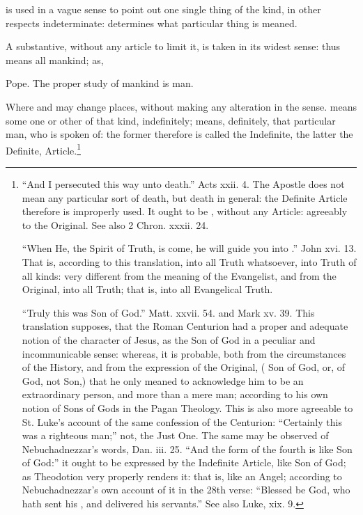  is used in a vague sense to point out one single thing of the
kind, in other respects indeterminate:  determines what
particular thing is meaned.

A substantive, without any article to limit it, is taken in its widest
sense: thus  means all mankind; as,

\begin{aquote}{Pope.}
  The proper study of mankind is man.
\end{aquote}

Where  and  may change places, without making any
alteration in the sense.  means some one or other of that
kind, indefinitely;  means, definitely, that particular man,
who is spoken of: the former therefore is called the Indefinite, the
latter the Definite, Article.\footnote{``And I persecuted this way unto
   death.'' Acts xxii. 4. The Apostle does not mean any
  particular sort of death, but death in general: the Definite Article
  therefore is improperly used. It ought to be , without
  any Article: agreeably to the Original. See also 2 Chron. xxxii. 24.

  ``When He, the Spirit of Truth, is come, he will guide you into
  .'' John xvi. 13. That is, according to this
  translation, into all Truth whatsoever, into Truth of all kinds: very
  different from the meaning of the Evangelist, and from the Original,
  into all  Truth; that is, into all Evangelical Truth.

  ``Truly this was  Son of God.'' Matt. xxvii. 54. and Mark xv.
  39. This translation supposes, that the Roman Centurion had a proper
  and adequate notion of the character of Jesus, as the Son of God in a
  peculiar and incommunicable sense: whereas, it is probable, both from
  the circumstances of the History, and from the expression of the
  Original, ( Son of God, or, of  God, not  Son,)
  that he only meaned to acknowledge him to be an extraordinary person,
  and more than a mere man; according to his own notion of Sons of Gods
  in the Pagan Theology. This is also more agreeable to St. Luke's
  account of the same confession of the Centurion: ``Certainly this was
  a righteous man;'' not, the Just One. The same may be observed of
  Nebuchadnezzar's words, Dan. iii. 25. ``And the form of the fourth is
  like  Son of God:'' it ought to be expressed by the Indefinite
  Article, like  Son of God; as Theodotion very properly renders
  it: that is, like an Angel; according to Nebuchadnezzar's own account
  of it in the 28th verse: ``Blessed be God, who hath sent his
  , and delivered his servants.'' See also Luke, xix. 9.

}
